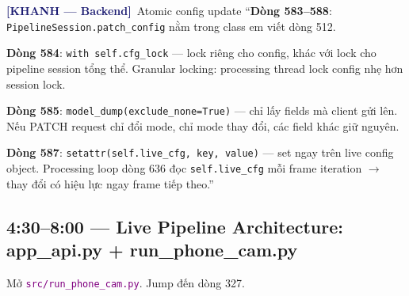 \documentclass[12pt, a4paper]{article}
\newcommand{\khanh}{\textcolor{MidnightBlue}{\textbf{[KHANH --- Backend]}}}
\newcommand{\fpath}[1]{\texttt{\textcolor{purple}{#1}}}
\begin{document}
\begin{dialog}{\khanh\ Atomic config update}
``\textbf{Dòng 583--588}: \texttt{PipelineSession.patch\_config} nằm trong class em viết dòng 512.

\textbf{Dòng 584}: \texttt{with self.cfg\_lock} --- lock riêng cho config, khác với lock cho pipeline session tổng thể.
Granular locking: processing thread lock config nhẹ hơn session lock.

\textbf{Dòng 585}: \texttt{model\_dump(exclude\_none=True)} --- chỉ lấy fields mà client gửi lên.
Nếu PATCH request chỉ đổi mode, chỉ mode thay đổi, các field khác giữ nguyên.

\textbf{Dòng 587}: \texttt{setattr(self.live\_cfg, key, value)} --- set ngay trên live config object.
Processing loop dòng 636 đọc \texttt{self.live\_cfg} mỗi frame iteration $\to$ thay đổi có hiệu lực ngay frame tiếp theo.''
\end{dialog}

\subsection{4:30--8:00 --- Live Pipeline Architecture: app\_api.py + run\_phone\_cam.py}

\begin{action}
Mở \fpath{src/run\_phone\_cam.py}. Jump đến dòng 327.
\end{action}
\end{document}

